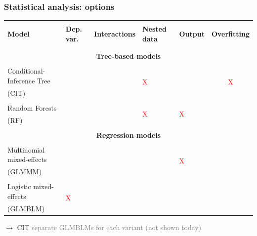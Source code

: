 \documentclass[12pt, table]{beamer}
\newcommand{\cmark}{\ding{51}}%
\begin{document}
\begin{frame}
\frametitle{Statistical analysis: options}
\begin{table}
\begin{tiny}
\begin{tabularx}{\textwidth}{l llllc}
\hline\\
\textbf{Model} & \textbf{Dep. var.} & \textbf{Interactions} & \textbf{Nested data} & \textbf{Output} & \textbf{Overfitting} \\\\
\hline\\
\multicolumn{6}{c}{\textbf{Tree-based models}} \\
\hline\\
Conditional-Inference Tree & 
\multirow{2}{*}{\textcolor{green}{\cmark}} & 
\multirow{2}{*}{\textcolor{green}{\cmark}} & 
\multirow{2}{*}{\textcolor{red}{X}}  &
\multirow{2}{*}{\textcolor{green}{\cmark}} & 
\multirow{2}{*}{\textcolor{red}{X}}  \\
(CIT)\\
\hline\\
Random Forests & 
\multirow{2}{*}{\textcolor{green}{\cmark}} & 
\multirow{2}{*}{\textcolor{green}{\cmark}} & 
\multirow{2}{*}{\textcolor{red}{X}}  &
\multirow{2}{*}{\textcolor{red}{X}}  &
\multirow{2}{*}{\textcolor{green}{\cmark}} \\
(RF)\\
\hline\\
\multicolumn{6}{c}{\textbf{Regression models}} \\
\hline\\
Multinomial mixed-effects   & 
\multirow{2}{*}{\textcolor{green}{\cmark}}& 
\multirow{2}{*}{\textcolor{green}{\cmark}}& 
\multirow{2}{*}{\textcolor{green}{\cmark}} &
\multirow{2}{*}{\textcolor{red}{X}}  & 
\multirow{2}{*}{\textcolor{green}{\cmark}} \\
(GLMMM) \\
\hline\\
Logistic mixed-effects   & 
\multirow{2}{*}{\textcolor{red}{X}} & 
\multirow{2}{*}{\textcolor{green}{\cmark}} & 
\multirow{2}{*}{\textcolor{green}{\cmark}} &
\multirow{2}{*}{\textcolor{green}{\cmark}} & 
\multirow{2}{*}{\textcolor{green}{\cmark}} \\
(GLMBLM)\\
\hline
\end{tabularx}
\end{tiny}
\end{table}
$\rightarrow$ CIT \textcolor{gray}{separate GLMBLMs for each variant (not shown today)}
\end{frame}
\end{document}
